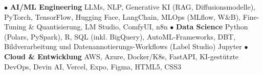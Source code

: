 \documentclass[10pt,a4paper,sans]{moderncv} %
\begin{document}
{\footnotesize $\bullet$ \textbf{AI/ML Engineering} \hfill{} \newline 
LLMs, NLP, Generative KI (RAG, Diffusionsmodelle), %
PyTorch, TensorFlow, Hugging Face, LangChain, %
MLOps (MLflow, W\&B), Fine-Tuning \& Quantisierung, LM Studio, ComfyUI, n8n\newline
\footnotesize $\bullet$ \textbf{Data Science} \hfill{} \newline
Python (Polars, PySpark), R, SQL (inkl. BigQuery), %
AutoML-Frameworks, DBT, Bildverarbeitung und Datenannotierungs-Workflows (Label Studio)
Jupyter \newline
\footnotesize $\bullet$ \textbf{Cloud \& Entwicklung} \hfill{} \newline
AWS, Azure, Docker/K8s, %
FastAPI, KI-gestützte DevOps, Devin AI, Vercel, Expo, Figma, HTML5, CSS3}
\end{document}
